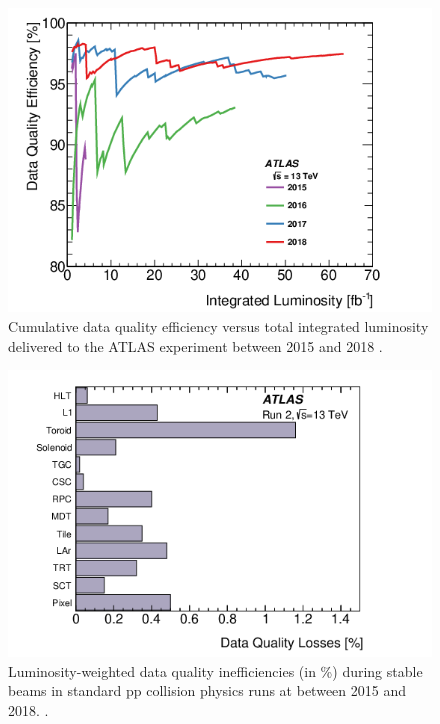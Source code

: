 		\begin{figure}
			\centering
			\includegraphics[width=.75\textwidth,keepaspectratio=true]{appendices/images/ATLAS_DQ_Run2_DQ_Efficiency.png}
			\caption{\label{fig:dq-run2-efficiency} Cumulative data quality efficiency versus total integrated luminosity delivered to the ATLAS experiment between 2015 and 2018 \cite{DQ-Run2}.}
		\end{figure}

		\begin{figure}
			\centering
			\includegraphics[width=.75\textwidth,keepaspectratio=true]{appendices/images/DQ_Inefficiencies.png}
			\caption{\label{fig:dq-run2-inefficiencies} Luminosity-weighted data quality inefficiencies (in \%) during stable beams in standard pp collision physics runs at \sqs between 2015 and 2018. \cite{DQ-Run2}.}
		\end{figure}



